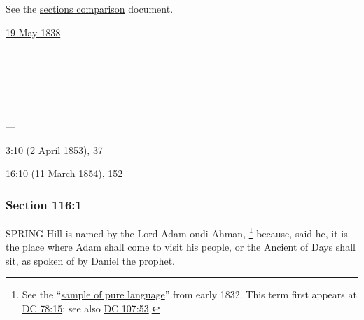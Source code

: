 		See the \href{https://drive.google.com/file/d/1goAvNz8jS4R8slYfMG_db55Ty2z_vmgK/view?usp=sharing}{sections comparison} document.
	
		\begin{compactdesc}
			\item[JSP] \hyperref[EMS-1838-JS-19-MAY-1838]{19 May 1838}
			\item[BC] ---
			\item[DC 1835] ---
			\item[DC 1844] ---
			\item[TS] ---
			\item[DN] 3:10 (2 April 1853), 37
			\item[MS] 16:10 (11 March 1854), 152
		\end{compactdesc}

	\subsubsection{Section 116:1} %
		\label{DC116-1}

		SPRING Hill is named by the Lord Adam-ondi-Ahman,%
			\footnote{%
				See the ``\hyperref[EMS-1832-JS-CIR-4-MAR-1832-LANG]{sample of pure language}'' from early 1832. This term first appears at \hyperref[DC78-15]{DC 78:15}; see also \hyperref[DC107-53]{DC 107:53}.
				}
		because, said he, it is the place where Adam shall come to visit his people, or the Ancient of Days shall sit, as spoken of by Daniel the prophet.

